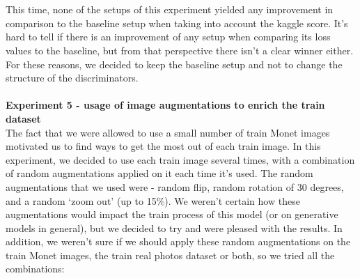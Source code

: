 \documentclass{article}
\begin{document}
\begin{table}[!ht]
    \centering
\end{table}
\\\\
This time, none of the setups of this experiment yielded any improvement in comparison to the baseline setup when taking into account the kaggle score. It's hard to tell if there is an improvement of any setup when comparing its loss values to the baseline, but from that perspective there isn’t a clear winner either. For these reasons, we decided to keep the baseline setup and not to change the structure of the discriminators.
\\\\
\newblock
\textbf{Experiment 5 - usage of image augmentations to enrich the train dataset}
\\
The fact that we were allowed to use a small number of train Monet images motivated us to find ways to get the most out of each train image. In this experiment, we decided to use each train image several times, with a combination of random augmentations applied on it each time it's used. The random augmentations that we used were - random flip, random rotation of 30 degrees, and a random ‘zoom out’ (up to 15\%). We weren’t certain how these augmentations would impact the train process of this model (or on generative models in general), but we decided to try and were pleased with the results. In addition, we weren't sure if we should apply these random augmentations on the train Monet images, the train real photos dataset or both, so we tried all the combinations:
\end{document}
